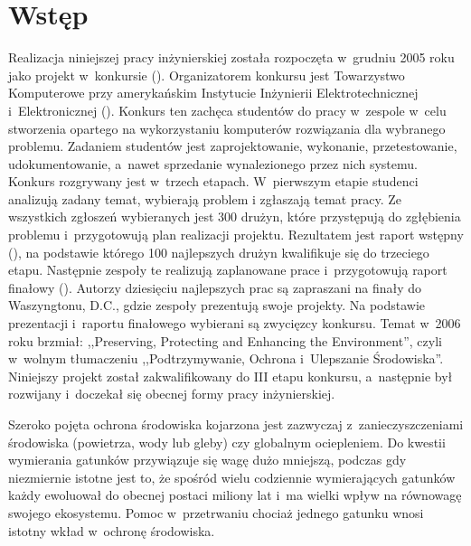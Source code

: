 
\chapter{Wstęp}
Realizacja niniejszej pracy inżynierskiej została rozpoczęta w~grudniu 2005 roku
jako projekt w~konkursie
(). Organizatorem
konkursu jest Towarzystwo Komputerowe przy amerykańskim Instytucie Inżynierii
Elektrotechnicznej i~Elektronicznej (). Konkurs
ten zachęca studentów do pracy w~zespole w~celu stworzenia opartego na
wykorzystaniu komputerów rozwiązania dla wybranego problemu. Zadaniem studentów
jest zaprojektowanie, wykonanie, przetestowanie, udokumentowanie, a~nawet
sprzedanie wynalezionego przez nich systemu. Konkurs rozgrywany jest w~trzech
etapach. W~pierwszym etapie studenci analizują zadany temat, wybierają problem i
zgłaszają temat pracy. Ze wszystkich zgłoszeń wybieranych jest 300 drużyn, które
przystępują do zgłębienia problemu i~przygotowują plan realizacji projektu.
Rezultatem jest raport wstępny (), na podstawie którego
100 najlepszych drużyn kwalifikuje się do trzeciego etapu. Następnie zespoły te
realizują zaplanowane prace i~przygotowują raport finałowy (). Autorzy dziesięciu najlepszych prac są zapraszani na finały do
Waszyngtonu, D.C., gdzie zespoły prezentują swoje projekty. Na podstawie
prezentacji i~raportu finałowego wybierani są zwycięzcy konkursu. Temat
 w~2006 roku brzmiał: ,,Preserving, Protecting and Enhancing the
Environment'', czyli w~wolnym tłumaczeniu ,,Podtrzymywanie, Ochrona i~Ulepszanie
Środowiska''. Niniejszy projekt został zakwalifikowany do III etapu konkursu,
a~następnie był rozwijany i~doczekał się obecnej formy pracy inżynierskiej.

Szeroko pojęta ochrona środowiska kojarzona jest zazwyczaj z~zanieczyszczeniami
środowiska (powietrza, wody lub gleby) czy globalnym ociepleniem. Do kwestii
wymierania gatunków przywiązuje się wagę dużo mniejszą, podczas gdy niezmiernie
istotne jest to, że spośród wielu codziennie wymierających gatunków każdy
ewoluował do obecnej postaci miliony lat i~ma wielki wpływ na równowagę swojego
ekosystemu. Pomoc w~przetrwaniu chociaż jednego gatunku wnosi istotny wkład
w~ochronę środowiska.

